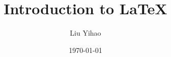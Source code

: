 \documentclass{beamer}
\title{Introduction to \LaTeX}
\author{Liu Yihao}
\date{\today}
\begin{document}
\begin{frame}
	\titlepage	
\end{frame}














\end{document}
